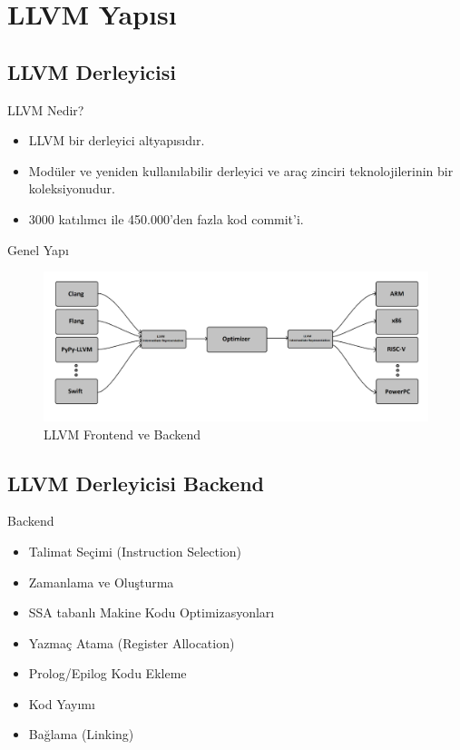 \section{LLVM Yapısı} %

\subsection{LLVM Derleyicisi}
\begin{frame}{LLVM Nedir?}
	\begin {itemize}
	    \item LLVM bir derleyici altyapısıdır.
	    \item Modüler ve yeniden kullanılabilir derleyici ve araç zinciri teknolojilerinin bir koleksiyonudur.
        \item 3000 katılımcı ile 450.000'den fazla kod commit'i.
	\end {itemize}
\end{frame}
\begin{frame}{Genel Yapı}
    \begin{figure}
	   \includegraphics[width=0.8\linewidth]{llvm_diagram.png}
	   \caption{LLVM Frontend ve Backend}
	\end{figure}
\end{frame}

\subsection{LLVM Derleyicisi Backend}
\begin{frame}{Backend}
    \begin{itemize}
        \item Talimat Seçimi (Instruction Selection)
        \item Zamanlama ve Oluşturma
        \item SSA tabanlı Makine Kodu Optimizasyonları
        \item Yazmaç Atama (Register Allocation)
        \item Prolog/Epilog Kodu Ekleme
        \item Kod Yayımı
        \item Bağlama (Linking)
        
    \end{itemize}
\end{frame}

